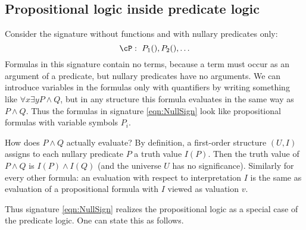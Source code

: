 \subsection{Propositional logic inside predicate logic}
Consider the signature without functions and with nullary predicates only:
\begin{equation}
\label{eqn:NullSign}
\cP:\ P_1(), P_2(), \ldots
\end{equation}
Formulas in this signature contain no terms, because a term must occur as an argument of a predicate, but nullary predicates have no arguments.
We can introduce variables in the formulas only with quantifiers by writing something like $\forall x \exists y P \wedge Q$,
but in any structure this formula evaluates in the same way as $P \wedge Q$.
Thus the formulas in signature \eqref{eqn:NullSign} look like propositional formulas with variable symbols $P_i$.

How does $P \wedge Q$ actually evaluate?
By definition, a first-order structure $(U,I)$ assigns to each nullary predicate $P$ a truth value $I(P)$.
Then the truth value of $P \wedge Q$ is $I(P) \wedge I(Q)$ (and the universe $U$ has no significance).
Similarly for every other formula: an evaluation with respect to interpretation $I$ is the same as evaluation of a propositional formula
with $I$ viewed as valuation $v$.

Thus signature \eqref{eqn:NullSign} realizes the propositional logic as a special case of the predicate logic.
One can state this as follows.
